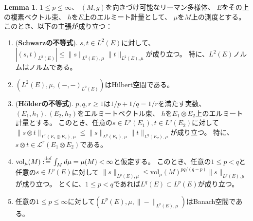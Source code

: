 \documentclass[uplatex]{jsarticle}
\theoremstyle{definition}
\newtheorem{lem}[lem]{Lemma}
\newcommand{\dfn}{:\overset{\mbox{{\scriptsize def}}}{=}}
\newcommand{\mcL}{\mathcal{L}}
\newcommand{\vol}{\mathrm{vol}}
\begin{document}
\begin{lem}
  \(1\leq p\leq \infty\)、
  \((M,g)\)を向きづけ可能なリーマン多様体、
  \(E\)をその上の複素ベクトル束、
  \(h\)を\(E\)上のエルミート計量として、
  \(\mu\)を\(M\)上の測度とする。
  このとき、以下の主張が成り立つ：
  \begin{enumerate}
    \item \label{Schwarz ineq}
    (\textbf{Schwarzの不等式}).
    \(s,t\in L^2(E)\)に対して、
    \(|(s,t)_{L^2(E)}| \leq \|s\|_{L^2(E),\mu}\|t\|_{L^2(E),\mu}\)が成り立つ。
    特に、\(L^2(E)\)ノルムはノルムである。
    \item \label{L2 is Hilbert}
    \((L^2(E),\mu,(-,-)_{L^2(E)})\)はHilbert空間である。
    \item \label{Holder ineq}
    (\textbf{H\"{o}lderの不等式}).
    \(p,q,r\geq 1\)は\(1/p+1/q=1/r\)を満たす実数、
    \((E_1,h_1), (E_2,h_2)\)をエルミートベクトル束、
    \(h\)を\(E_1\otimes E_2\)上のエルミート計量とする。
    このとき、任意の\(s\in L^p(E_1), t\in L^q(E_2)\)に対して
    \(\|s\otimes t\|_{L^r(E_1\otimes E_2),\mu} \leq \|s\|_{L^p(E_1),\mu}\|t\|_{L^q(E_2),\mu}\)が成り立つ。
    特に、\(s\otimes t\in \mcL^r(E_1\otimes E_2)\)である。
    \item \label{Lp inclusion}
    \(\vol_{\mu}(M) \dfn \int_Md\mu = \mu(M) < \infty\)と仮定する。
    このとき、任意の\(1\leq p < q\)と
    任意の\(s\in L^p(E)\)に対して
    \(\|s\|_{L^p(E),\mu} \leq \vol_{\mu}(M)^{pq/(q-p)}\|s\|_{L^q(E),\mu}\)
    が成り立つ。
    とくに、\(1\leq p < q\)であれば\(L^q(E) \subset L^p(E)\)が成り立つ。
    \item \label{Lp is Banach}
    任意の\(1\leq p\leq \infty\)に対して\((L^p(E),\mu,\|-\|_{L^p(E),\mu})\)はBanach空間である。
  \end{enumerate}
\end{lem}
\end{document}
